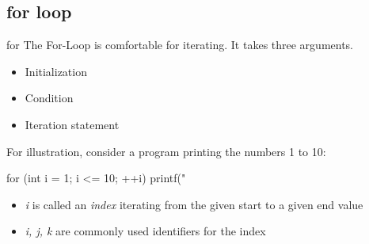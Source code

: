 \documentclass[10pt,graphics,aspectratio=169,table]{beamer}
\begin{document}
\subsection{for loop}

\begin{frame}[fragile]{for}
    The For-Loop is comfortable for iterating. It takes three arguments.
    \begin{itemize}
        \item Initialization
        \item Condition
        \item Iteration statement
    \end{itemize}
    \bigskip
    For illustration, consider a program printing the numbers 1 to 10:
    \begin{codeblock}
for (int i = 1; i <= 10; ++i){
    printf("%
}
\end{codeblock}
    \begin{itemize}
        \item \textit{i} is called an \textit{index} iterating from the given start to a given end value
        \item \textit{i, j, k} are commonly used identifiers for the index
    \end{itemize}
\end{frame}
\end{document}
